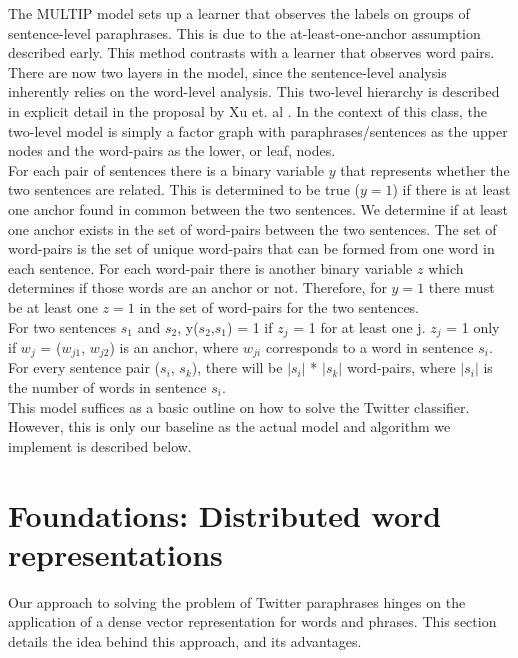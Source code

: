 \documentclass[conference]{IEEEtran}
\begin{document}
\indent The MULTIP model sets up a learner that observes the labels on groups of sentence-level paraphrases. This is due to the at-least-one-anchor assumption described early. This method contrasts with a learner that observes word pairs. There are now two layers in the model, since the sentence-level analysis inherently relies on the word-level analysis. This two-level hierarchy is described in explicit detail in the proposal by Xu et. al \cite{zane}. In the context of this class, the two-level model is simply a factor graph with paraphrases/sentences as the upper nodes and the word-pairs as the lower, or leaf, nodes.\\
\indent For each pair of sentences there is a binary variable $y$ that represents whether the two sentences are related. This is determined to be true ($y=1$) if there is at least one anchor found in common between the two sentences. We determine if at least one anchor exists in the set of word-pairs between the two sentences. The set of word-pairs is the set of unique word-pairs that can be formed from one word in each sentence. For each word-pair there is another binary variable $z$ which determines if those words are an anchor or not. Therefore, for $y=1$ there must be at least one $z=1$ in the set of word-pairs for the two sentences.  \\

For two sentences $s_{1}$ and $s_{2}$, y($s_{2}$,$s_{1}$) = 1 
if $z_{j}$ = 1 for at least one j. $z_{j}$ = 1 only if $w_{j}$ = ($w_{j1}$, $w_{j2}$) is an anchor, where $w_{ji}$ corresponds to a word in sentence $s_{i}$. For every sentence pair ($s_{i}$, $s_{k}$), there will be $|s_{i}|$ * $|s_{k}|$ word-pairs, where $|s_{i}|$ is the number of words in sentence $s_{i}$. \\

\indent This model suffices as a basic outline on how to solve the Twitter classifier. However, this is only our baseline as the actual model and algorithm we implement is described below.
 
 \section{Foundations: Distributed word representations}
 \noindent Our approach to solving the problem of Twitter paraphrases hinges on the application of a dense vector representation for words and phrases.  This section details the idea behind this approach, and its advantages.\\
\end{document}
